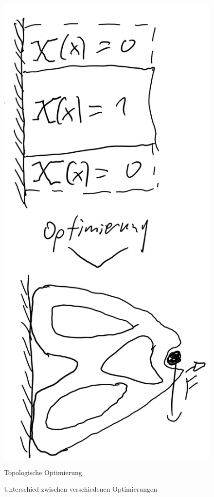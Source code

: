\documentclass{article}
\begin{document}
\begin{figure}[htbp]
\begin{minipage}{0.2\textwidth}
          \end{minipage}\hfill
          \begin{minipage}{0.2\textwidth}
            \centering
            \includegraphics[width=\linewidth]{figures/Topo-opt.png}
            \caption{Topologische Optimierung}
          \end{minipage}
    \caption{Unterschied zwischen verschiedenen Optimierungen}
    \label{fig:unterschied}
\end{figure}
\end{document}
